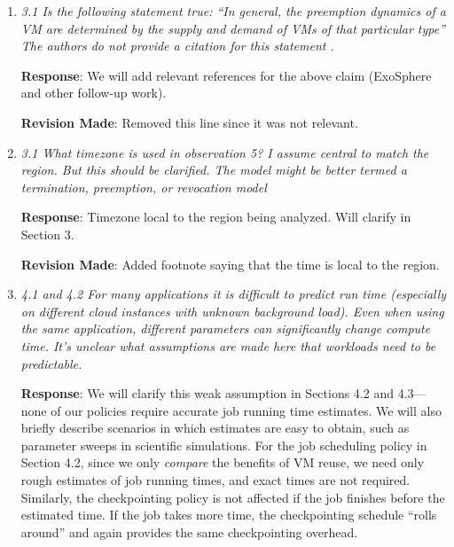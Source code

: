 \documentclass{article}
\newcommand{\resp}[1]{\textbf{Response}: #1}
\newcommand{\revmade}[1]{\textbf{Revision Made}: #1}
\begin{document}
\begin{enumerate}


\item \emph{3.1 Is the following statement true: “In general, the preemption dynamics of a VM are determined by the supply and demand of VMs of that particular type” The authors do not provide a citation for this statement .}

  \resp{We will add relevant references for the above claim (ExoSphere and other follow-up work).}
  

\revmade{Removed this line since it was not relevant. }

\item \emph{3.1 What timezone is used in observation 5? I assume central to match the region. But this should be clarified.
The model might be better termed a termination, preemption, or revocation model}

\resp{Timezone local to the region being analyzed. Will clarify in Section 3.}

\revmade{Added footnote saying that the time is local to the region.}








\item \emph{4.1 and 4.2 For many applications it is difficult to predict run time (especially on different cloud instances with unknown background load). Even when using the same application, different parameters can significantly change compute time. It's unclear what assumptions are made here that workloads need to be predictable.}
  
  \resp{We will clarify this weak assumption in Sections 4.2 and 4.3---none of our policies require accurate job running time estimates. We will also briefly describe scenarios in which estimates are easy to obtain, such as parameter sweeps in scientific simulations. 
    For the job scheduling policy in Section 4.2, since we only \emph{compare} the benefits of VM reuse, we need only rough estimates of job running times, and exact times are not required. 
    Similarly, the checkpointing policy is not affected  if the job finishes before the estimated time. If the job takes more time, the checkpointing schedule ``rolls around'' and again provides the same checkpointing overhead.}



\end{enumerate}
\end{document}
